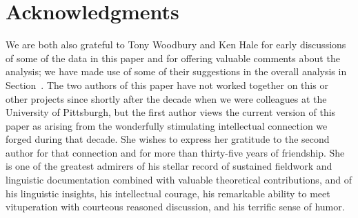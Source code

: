 \documentclass[output=paper,colorlinks,citecolor=brown]{langscibook}
\begin{document}
\section*{Acknowledgments}


   We are both also grateful to Tony Woodbury and {\dag}Ken Hale for
   early discussions of some of the data in this paper and for
   offering valuable comments about the analysis; we have made use of
   some of their suggestions in the overall analysis in Section~.  The
   two authors of this paper have not worked together on this or
   other projects since shortly after the decade when we were
   colleagues at the University of Pittsburgh, but the first author
   views the current version of this paper as arising from the
   wonderfully stimulating intellectual connection we forged during
   that decade.  She wishes to express her gratitude to the second
   author for that connection and for more than thirty-five years of
   friendship.  She is one of the greatest admirers of his stellar
   record of sustained fieldwork and linguistic documentation
   combined with valuable theoretical contributions, and of his
   linguistic insights, his intellectual courage, his remarkable
   ability to meet vituperation with courteous reasoned discussion,
   and his terrific sense of humor.



\sloppy
\printbibliography[heading=subbibliography,notkeyword=this]
\end{document}

